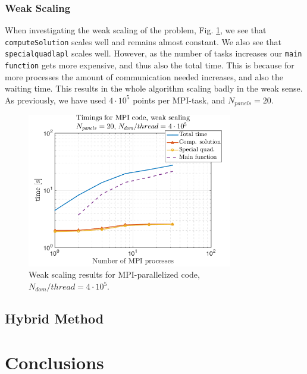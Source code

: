 \documentclass[a4paper,10pt]{article}
\def\code#1{\texttt{#1}}
\begin{document}
\subsubsection*{Weak Scaling}
When investigating the weak scaling of the problem, Fig. \ref{fig:mpi_weaktime}, we see that \code{computeSolution} scales well and remains almost constant. We also see that \code{specialquadlapl} scales well. However, as the number of tasks increases our \code{main function} gets more expensive, and thus also the total time. This is because for more processes the amount of communication needed increases, and also the waiting time. This results in the whole algorithm scaling badly in the weak sense. As previously, we have used $4\cdot 10^5$ points per MPI-task, and $N_{panels}=20$.
\begin{figure}[ht]
    \begin{center}
        \includegraphics[width=0.8\textwidth]{Graphics/craypat_mpi_weakscaling.png}
    \end{center}
    \caption{Weak scaling results for MPI-parallelized code, $N_{dom}/thread=4\cdot 10^5$.}
    \label{fig:mpi_weaktime}
\end{figure}


\FloatBarrier

\subsection*{Hybrid Method}


\FloatBarrier



\section*{Conclusions}
\end{document}
